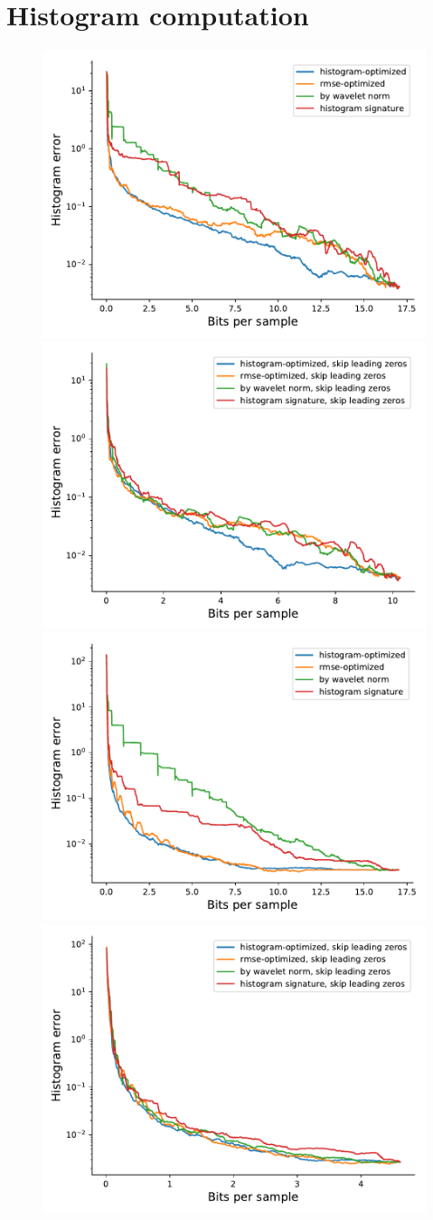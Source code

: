 
\section{Histogram computation}

\begin{figure}
	\centering
	{\includegraphics[width=0.48\linewidth]{img/histogram/boiler-histogram.pdf}}
	{\includegraphics[width=0.48\linewidth]{img/histogram/skip-leading-zeros/boiler-histogram.pdf}}
	{\includegraphics[width=0.48\linewidth]{img/histogram/kflame-histogram.pdf}}
	{\includegraphics[width=0.48\linewidth]{img/histogram/skip-leading-zeros/kflame-histogram.pdf}}

\end{figure}
